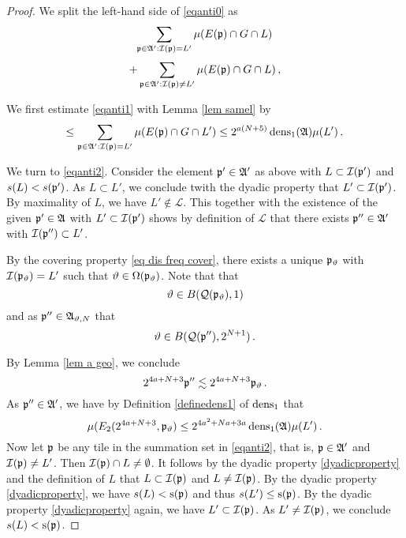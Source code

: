 \begin{proof}
We split the left-hand side of \eqref{eqanti0} as
\begin{equation}\label{eqanti1}
    \sum_{\mathfrak p\in\mathfrak{A}':\mathcal{I}(\mathfrak p)=L'}\mu(E(\mathfrak p)\cap G\cap L)
\end{equation}
\begin{equation}\label{eqanti2}
    +
        \sum_{\mathfrak p\in\mathfrak{A}':\mathcal{I}(\mathfrak p)\neq L'}\mu(E(\mathfrak p)\cap G\cap L)\, ,
\end{equation}

We first estimate \eqref{eqanti1}
with Lemma \ref{lem samel} by
\begin{equation}\label{equanti1.5}
    \le \sum_{\mathfrak p\in\mathfrak{A}':\mathcal{I}(\mathfrak p)=L'}\mu(E(\mathfrak p)\cap G\cap L')\le 2^{a(N+5)}\operatorname{\operatorname{dens}}_1(\mathfrak{A})\mu(L')\, .
\end{equation}



We turn to \eqref{eqanti2}.
Consider the element $\mathfrak p'\in \mathfrak{A}'$ as above
with $L\subset \mathcal{I}(\mathfrak p')$ and $s(L)<s(\mathfrak p')$.
As $L\subset L'$, we conclude twith the dyadic property that $L'\subset \mathcal{I}(\mathfrak p')$.
By maximality of $L$, we have
$L'\not\in \mathcal{L}$.
This together with the existence of the given $\mathfrak p'\in \mathfrak{A}$
with $L'\subset \mathcal{I}(\mathfrak p')$
shows by definition of $\mathcal{L}$ that there exists $\mathfrak p''\in \mathfrak{A}'$ with
$\mathcal{I}(\mathfrak p'')\subset L'$.




By the covering property \eqref{eq dis freq cover}, there exists a unique $\mathfrak p_{\vartheta}$ with $\mathcal{I}(\mathfrak p_{\vartheta})=L'$
such that $\vartheta\in \Omega(\mathfrak p_{\vartheta})$.
Note that
that
\begin{equation}
    \vartheta\in B(\mathcal{Q}(\mathfrak p_{\vartheta}), 1)
\end{equation}
and as  $\mathfrak p'' \in \mathfrak{A}_{\vartheta,N}$ that
\begin{equation}
    \vartheta \in B(\mathcal{Q}(\mathfrak p''), 2^{N+1})\, .
\end{equation}


By Lemma \ref{lem a geo}, we conclude
\begin{equation}
        2^{4a+N+3}\mathfrak p''  \lesssim  2^{4a+N+3}\mathfrak p_{\vartheta} \, .
    \end{equation}
As $\mathfrak p''\in \mathfrak{A}'$, we have by Definition
\eqref{definedens1} of $\operatorname{\operatorname{dens}}_1$ that
\begin{equation}\label{pmfadens}
    {\mu(E_2(2^{4a+N+3}, \mathfrak p_{\vartheta})}\le 2^{4a^2+Na+3a}\operatorname{\operatorname{dens}}_1(\mathfrak{A}) {\mu(L')}\, .
\end{equation}
Now let $\mathfrak p$ be any tile in the summation set in \eqref{eqanti2}, that is, $\mathfrak p\in \mathfrak{A}'$ and $\mathcal{I}(\mathfrak p)\neq L'$.
Then $\mathcal{I}(\mathfrak p)\cap L\neq \emptyset$. It follows by the dyadic property \eqref{dyadicproperty}
and the definition of $L$ that
$L\subset \mathcal{I}(\mathfrak p)$ and $L\neq \mathcal{I}(\mathfrak p)$. By the dyadic property \eqref{dyadicproperty}, we have
$s(L)<\mathrm{s}(\mathfrak p)$ and thus $s(L')\le \mathrm{s}(\mathfrak p)$. By the dyadic property
    \eqref{dyadicproperty} again, we have $L'\subset \mathcal{I}(\mathfrak p)$.
As $L'\neq \mathcal{I}(\mathfrak p)$, we conclude $s(L)<\mathrm{s}(\mathfrak p)$.





\end{proof}
